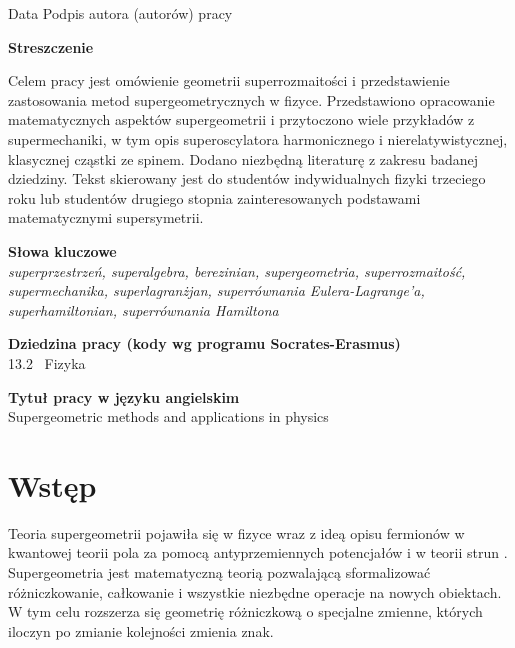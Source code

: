 \documentclass[11pt,a4paper]{report}
\theoremstyle{definition}
\begin{document}
\noindent \hspace{1cm} \textnormal{Data} \hspace{2cm} \textnormal{Podpis autora (autorów) pracy}

\newpage

\begin{center}
\textbf{Streszczenie}
\end{center}
\textnormal{Celem pracy jest omówienie geometrii superrozmaitości i przedstawienie zastosowania metod supergeometrycznych w fizyce. Przedstawiono opracowanie matematycznych aspektów supergeometrii i przytoczono wiele przykładów z supermechaniki, w tym opis superoscylatora harmonicznego i nierelatywistycznej, klasycznej cząstki ze spinem. Dodano niezbędną literaturę z zakresu badanej dziedziny. Tekst skierowany jest do studentów indywidualnych fizyki trzeciego roku lub studentów drugiego stopnia zainteresowanych podstawami matematycznymi supersymetrii.}

\vspace{2cm}

\begin{center}
\textbf{Słowa kluczowe}\\[0.5cm]
\textit{superprzestrzeń, superalgebra, berezinian, supergeometria,  superrozmaitość, supermechanika, superlagranżjan, superrównania Eulera-Lagrange'a, superhamiltonian, superrównania Hamiltona}
\end{center}
\vspace{2cm}

\begin{center}
\textbf{Dziedzina pracy (kody wg programu Socrates-Erasmus)}\\[0.5cm]
\textnormal{13.2 \ Fizyka}
\end{center}
\vspace{2cm}

\begin{center}
\textbf{Tytuł pracy w języku angielskim}\\[0.5cm]
\textnormal{Supergeometric methods and applications in physics}
\end{center}

\newpage
\tableofcontents

\newpage
\chapter*{Wstęp}
Teoria supergeometrii pojawiła się w fizyce wraz z ideą opisu fermionów w kwantowej teorii pola za pomocą antyprzemiennych potencjałów \cite{schmitt} i w teorii strun \cite{GS71,Sc12}. Supergeometria jest matematyczną teorią pozwalającą sformalizować różniczkowanie, całkowanie i wszystkie niezbędne operacje na nowych obiektach. W tym celu rozszerza się geometrię różniczkową o specjalne zmienne, których iloczyn po zmianie kolejności zmienia znak.
\end{document}
